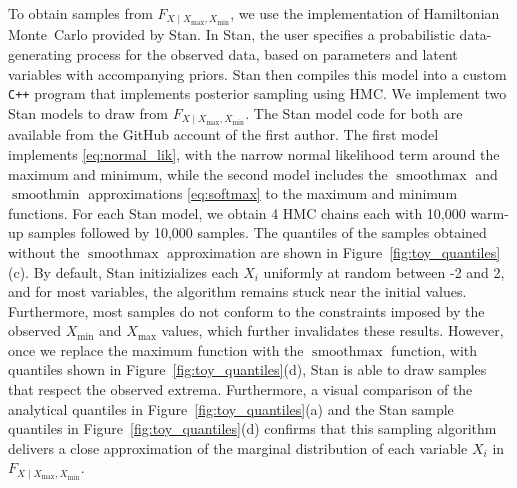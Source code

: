 \documentclass[letter]{article}
\DeclareMathOperator*{\softmax}{smoothmax}
\DeclareMathOperator*{\softmin}{smoothmin}
\newcommand{\Xmax}{X_{\max}}
\newcommand{\Xmin}{X_{\min}}
\newcommand{\Fcond}{F_{X \mid \Xmax,\Xmin}}
\begin{document}
        To obtain samples from \(\Fcond\), we use the implementation of Hamiltonian Monte~Carlo provided by Stan.
In Stan, the user specifies a probabilistic data-generating process for the observed data, based on parameters and latent variables with accompanying priors.
Stan then compiles this model into a custom \texttt{C++} program that implements
posterior sampling using HMC.
We implement two Stan models to draw from \(\Fcond\).
The Stan model code for both are available from the GitHub account of the first author.
The first model implements \eqref{eq:normal_lik},
with the narrow normal likelihood term around the maximum and minimum,
while the second model includes the \(\softmax\) and \(\softmin\) approximations \eqref{eq:softmax} to the maximum and minimum functions.
For each Stan model, we obtain 4 HMC chains each with 10,000 warm-up samples followed by 10,000 samples.
The quantiles of the samples obtained without the \(\softmax\) approximation are shown in Figure~\ref{fig:toy_quantiles}(c).
By default, Stan initizializes each \(X_i\) uniformly at random between -2 and 2,
and for most variables, the algorithm remains stuck near the initial values.
Furthermore, most samples do not conform to the constraints imposed by the observed \(\Xmin\) and \(\Xmax\) values, which further invalidates these results.
However, once we replace the maximum function with the \(\softmax\) function,
with quantiles shown in Figure~\ref{fig:toy_quantiles}(d),
Stan is able to draw samples that respect the observed extrema.
Furthermore, a visual comparison of the analytical quantiles in Figure~\ref{fig:toy_quantiles}(a)
and the Stan sample quantiles in Figure~\ref{fig:toy_quantiles}(d) confirms that
this sampling algorithm delivers a close approximation of the marginal distribution of each variable \(X_i\) in \(\Fcond\).
    
\end{document}
